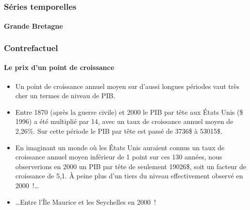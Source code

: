 \documentclass[10pt,notheorems]{beamer}
\theoremstyle{plain}
\theoremstyle{definition} %
\begin{document}
\begin{frame}
  \frametitle{Séries temporelles}
  \framesubtitle{Grande Bretagne}

  \begin{center}
    
  \end{center}

\end{frame}


\begin{frame}
  \frametitle{Contrefactuel}
  \framesubtitle{Le prix d'un point de croissance}

  \begin{itemize}

  \item Un point de croissance annuel moyen sur d'aussi longues périodes vaut très cher un termes de niveau de PIB.\newline

  \item Entre 1870 (après la guerre civile) et 2000 le PIB par tête aux États Unis (\$ 1996) a été multiplié par 14, avec un taux de croissance annuel moyen de 2,26\%. Sur cette période le PIB par tête est passé de  3736\$ à 53015\$.\newline

  \item En imaginant un monde où les États Unis auraient connus un taux de croissance annuel moyen inférieur de 1 point sur ces 130 années, nous observerions en 2000 un PIB par tête de seulement 19026\$, soit un facteur de croissance de 5,1. À peine plus d'un tiers du niveau effectivement observé en 2000~!\ldots\newline

  \item \ldots Entre l'Île Maurice et les Seychelles en 2000~!

  \end{itemize}

\end{frame}
\end{document}
